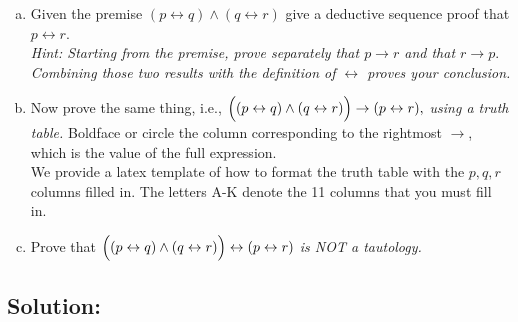 \documentclass[12pt]{article}
\begin{document}
\begin{enumerate}[(a)]
    \item Given the premise $(p \leftrightarrow q) \wedge(q \leftrightarrow r)$ give a deductive sequence proof that $p \leftrightarrow r.$\\
    {\em \small Hint: Starting from the premise, prove separately that $p \rightarrow r$ and that $r \rightarrow p.$ Combining those two results with the definition of $\leftrightarrow$ proves your conclusion.}
    
    \item Now prove the same thing, i.e.,  
     $\Bigl ((p \leftrightarrow q) \wedge(q \leftrightarrow r)\Bigr)\rightarrow (p \leftrightarrow r),$  {\em using a truth table.} 
     Boldface or circle the column corresponding to the rightmost $\rightarrow$, which is the value of the full expression.\\
We provide  a latex template of how to format the truth table with the $p,q,r$ columns filled in.    The letters A-K  denote the 11 columns that you must  fill in.

     \item Prove that $\Bigl ((p \leftrightarrow q) \wedge(q \leftrightarrow r)\Bigr)\leftrightarrow (p \leftrightarrow r)$  {\em is NOT a tautology.}
\end{enumerate}



\newpage
\subsection*{\textbf{Solution:}}
\end{document}
